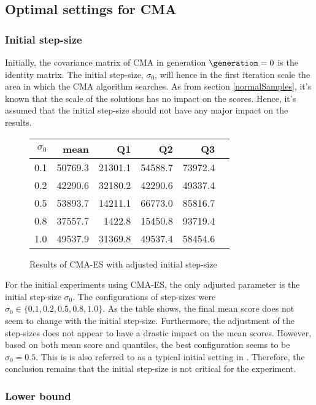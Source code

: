 \subsection{Optimal settings 
for CMA \label{optimalsettingscma}}



\subsubsection{Initial step-size}
Initially, the covariance matrix of CMA in generation $\generation = 0$
is the identity matrix. The initial step-size, $\sigma_0$, will hence in 
the first iteration scale the area in which the CMA algorithm searches.
As from section \ref{normalSamples}, it's known that the scale of the 
solutions has no impact on the scores. Hence, it's assumed that the initial 
step-size should not have any major impact on the results.

\begin{figure}[H]
\centering
\begin{tabular}{r | r r r r r}
$\sigma_0$ & mean & Q1 & Q2 & Q3\\
\hline
0.1 & 50769.3 & 21301.1 & 54588.7 & 73972.4\\
0.2 & 42290.6 & 32180.2 & 42290.6 & 49337.4\\
0.5 & 53893.7 & 14211.1 & 66773.0 & 85816.7\\
0.8 & 37557.7 & 1422.8  & 15450.8 & 93719.4\\
1.0 & 49537.9 & 31369.8 & 49537.4 & 58454.6
\end{tabular}
\caption{Results of CMA-ES with adjusted initial step-size \label{CMAInitialSigmaConfigTest}}
\end{figure}

For the initial experiments using CMA-ES, 
the only adjusted parameter is the initial 
step-size $\sigma_0$. The configurations of step-sizes were 
$\sigma_0 \in \{0.1, 0.2, 0.5, 0.8, 1.0\}$. As the table shows,
the final mean score does not seem to change with the initial step-size.
Furthermore, the adjustment of the step-sizes does not appear to 
have a drastic impact on the mean scores. However, based on both mean score and
quantiles, the best configuration seems to be $\sigma_0 = 0.5$. This is 
is also referred to as a typical initial setting in \citep{boumaza2009}.
Therefore, the conclusion remains that the initial step-size is not critical 
for the experiment.\\


\subsubsection{Lower bound}

